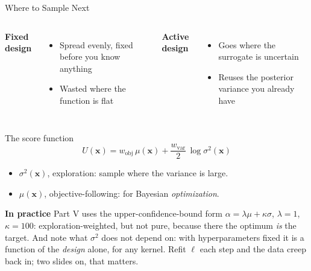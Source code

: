 \documentclass[aspectratio=169,11pt]{beamer}
\newcommand{\emphc}[1]{\textcolor{harvardcrimson}{#1}}
\newcommand{\x}{\bm{x}}
\begin{document}
\begin{frame}{Where to Sample Next}
\small
\begin{columns}[T]
\textbf{Fixed design}
\begin{itemize}\itemsep1pt
  \item Spread evenly, fixed before you know anything
  \item Wasted where the function is flat
\end{itemize}
\textbf{Active design}
\begin{itemize}\itemsep1pt
  \item Goes where the surrogate is \emphc{uncertain}
  \item Reuses the posterior variance you already have
\end{itemize}
\end{columns}

\vspace{-0.02cm}
\begin{block}{The score function}
\vspace{-6pt}
\[
U(\x) = w_{\mathrm{obj}}\, \mu(\x) + \frac{w_{\mathrm{var}}}{2}\,\log \sigma^2(\x)
\]
\vspace{-8pt}
\begin{itemize}\itemsep1pt
  \item $\sigma^2(\x)$, \emphc{exploration}: sample where the variance is large.
  \item $\mu(\x)$, \emphc{objective-following}: for Bayesian \emph{optimization}.
\end{itemize}
\end{block}

\vspace{0.02cm}
{\footnotesize \textbf{In practice} Part V uses the upper-confidence-bound form $\alpha = \lambda\mu + \kappa\sigma$, $\lambda = 1$, $\kappa = 100$: exploration-weighted, but not pure, because there the optimum \emph{is} the target. \emphc{And note what $\sigma^2$ does not depend on:} with hyperparameters fixed it is a function of the \emph{design} alone, for any kernel. Refit $\ell$ each step and the data creep back in; two slides on, that matters.}
\end{frame}
\end{document}
